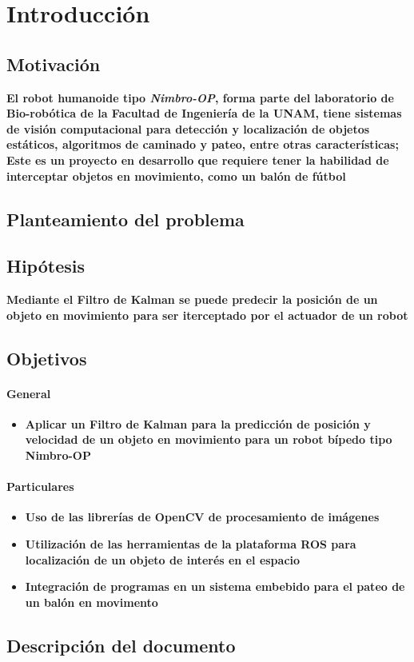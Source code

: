 \chapter{Introducción}

\section{Motivación}
	\textbf{El robot humanoide tipo \textit{Nimbro-OP}, forma parte del laboratorio de Bio-robótica de la Facultad de Ingeniería de la UNAM, tiene sistemas de visión computacional para detección y localización de objetos estáticos, algoritmos de caminado y pateo, entre otras características; Este es un proyecto en desarrollo que requiere tener la habilidad de interceptar objetos en movimiento, como un balón de fútbol}
\section{Planteamiento del problema}
\section{Hipótesis}
		\textbf{Mediante el Filtro de Kalman se puede predecir la posición de un objeto en movimiento para ser iterceptado por el actuador de un robot}
\section{Objetivos}
	\subsubsection{General}
		\begin{itemize}
			\item \textbf{Aplicar un Filtro de Kalman para la predicción de posición y velocidad de un objeto en movimiento para un robot bípedo tipo Nimbro-OP}
		\end{itemize}
	\subsubsection{Particulares}
		\begin{itemize}
			\item \textbf{Uso de las librerías de OpenCV de procesamiento de imágenes}
			\item \textbf{Utilización de las herramientas de la plataforma ROS para localización de un objeto de interés en el espacio}
			\item \textbf{Integración de programas en un sistema embebido para el pateo de un balón en movimento}
		\end{itemize}		
\section{Descripción del documento}